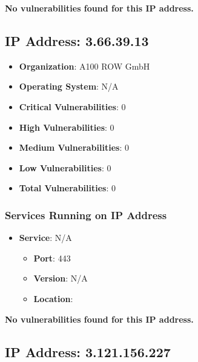 \documentclass{article}
\begin{document}
\textbf{No vulnerabilities found for this IP address.}




\clearpage



\subsection{IP Address: 3.66.39.13}

\begin{itemize}
    \item \textbf{Organization}: A100 ROW GmbH
    \item \textbf{Operating System}:  N/A 
    \item \textbf{Critical Vulnerabilities}: 0
    \item \textbf{High Vulnerabilities}: 0
    \item \textbf{Medium Vulnerabilities}: 0
    \item \textbf{Low Vulnerabilities}: 0
    \item \textbf{Total Vulnerabilities}: 0
\end{itemize}

\subsubsection*{Services Running on IP Address}

\begin{itemize}
    
        \item \textbf{Service}: N/A
        \begin{itemize}
            \item \textbf{Port}: 443
            \item \textbf{Version}:  N/A 
            \item \textbf{Location}: \href{  }{  }
        \end{itemize}
    
\end{itemize}


\textbf{No vulnerabilities found for this IP address.}




\clearpage



\subsection{IP Address: 3.121.156.227}
\end{document}
